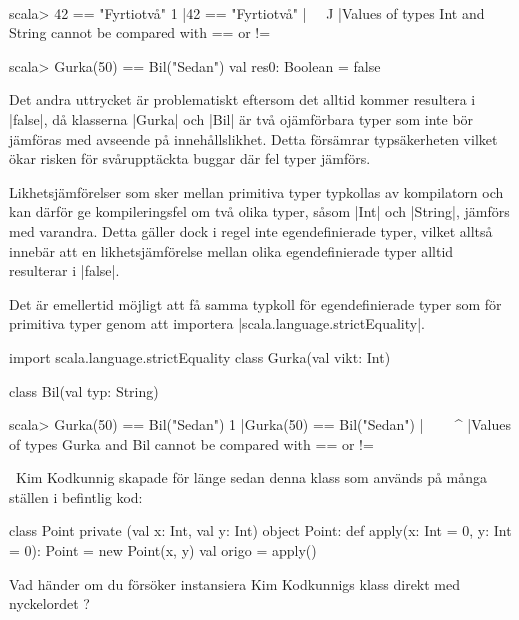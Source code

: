 \TaskSolved \what~
\begin{REPL}
scala> 42 == "Fyrtiotvå"
1 |42 == "Fyrtiotvå"
  |^^^^^^^^^^^^^^^^^
  |Values of types Int and String cannot be compared with == or !=

scala> Gurka(50) == Bil("Sedan")
val res0: Boolean = false
\end{REPL}

Det andra uttrycket är problematiskt eftersom det alltid kommer resultera i \code|false|, då klasserna \code|Gurka| och \code|Bil| är två ojämförbara typer som inte bör jämföras med avseende på innehållslikhet. Detta försämrar typsäkerheten vilket ökar risken för svårupptäckta buggar där fel typer jämförs.

Likhetsjämförelser som sker mellan primitiva typer typkollas av kompilatorn och kan därför ge kompileringsfel om två olika typer, såsom \code|Int| och \code|String|, jämförs med varandra. Detta gäller dock i regel inte egendefinierade typer, vilket alltså innebär att en likhetsjämförelse mellan olika egendefinierade typer alltid resulterar i \code|false|.

Det är emellertid möjligt att få samma typkoll för egendefinierade typer som för primitiva typer genom att importera \code|scala.language.strictEquality|.

\begin{Code}
import scala.language.strictEquality
class Gurka(val vikt: Int)

class Bil(val typ: String)
\end{Code}

\begin{REPL}
scala> Gurka(50) == Bil("Sedan")
1 |Gurka(50) == Bil("Sedan")
  |^^^^^^^^^^^^^^^^^^^^^^^^^
  |Values of types Gurka and Bil cannot be compared with == or !=
\end{REPL}

\QUESTEND



\QUESTBEGIN

\Task \what~Kim Kodkunnig skapade för länge sedan denna klass som används på många ställen i befintlig kod:

\begin{Code}
class Point private (val x: Int, val y: Int)
object Point:
  def apply(x: Int = 0, y: Int = 0): Point = new Point(x, y)
  val origo = apply()
\end{Code}

\Subtask Vad händer om du försöker instansiera Kim Kodkunnigs klass direkt med nyckelordet ?

